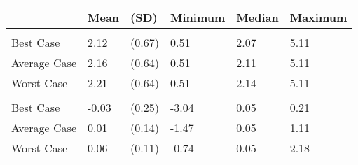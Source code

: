 
\begin{tabular}[t]{llllll}
\toprule
 & Mean & (SD) & Minimum & Median & Maximum\\
\midrule
\addlinespace[0.3em]
\multicolumn{6}{l}{\textbf{Prices}}\\
\hspace{1em}Best Case & 2.12 & (0.67) & 0.51 & 2.07 & 5.11\\
\hspace{1em}Average Case & 2.16 & (0.64) & 0.51 & 2.11 & 5.11\\
\hspace{1em}Worst Case & 2.21 & (0.64) & 0.51 & 2.14 & 5.11\\
\addlinespace[0.3em]
\multicolumn{6}{l}{\textbf{Price Change}}\\
\hspace{1em}Best Case & -0.03 & (0.25) & -3.04 & 0.05 & 0.21\\
\hspace{1em}Average Case & 0.01 & (0.14) & -1.47 & 0.05 & 1.11\\
\hspace{1em}Worst Case & 0.06 & (0.11) & -0.74 & 0.05 & 2.18\\
\bottomrule
\end{tabular}
